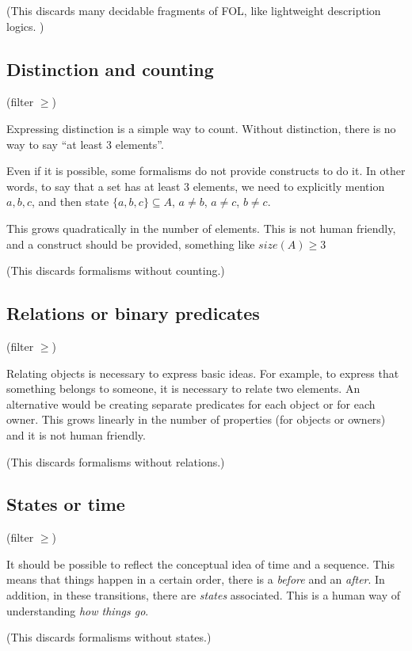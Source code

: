 (This discards many decidable fragments of FOL, like lightweight description logics. )

\subsection{Distinction and counting}

(filter $\geq $)

Expressing distinction is a simple way to count.
Without distinction, there is no way to say ``at least 3 elements''.

Even if it is possible, some formalisms do not provide constructs to do it.
In other words, to say that a set has at least 3 elements, we need to explicitly mention $a, b, c$, and then state
$\{a, b, c\} \subseteq A$, $a \neq b$, $a \neq c$, $b \neq c$.

This grows quadratically in the number of elements.
This is not human friendly, and a construct should be provided, something like $size(A) \geq 3$

(This discards formalisms without counting.)

\subsection{Relations or binary predicates}

(filter $\geq $)

Relating objects is necessary to express basic ideas.
For example, to express that something belongs to someone, it is necessary to relate two elements.
An alternative would be creating separate predicates for each object or for each owner.
This grows linearly in the number of properties (for objects or owners) and it is not human friendly.

(This discards formalisms without relations.)

\subsection{States or time}

(filter $\geq $)

It should be possible to reflect the conceptual idea of time and a sequence.
This means that things happen in a certain order, there is a \textit{before} and an \textit{after}.
In addition, in these transitions, there are \textit{states} associated.
This is a human way of understanding \textit{how things go}.

(This discards formalisms without states.)

